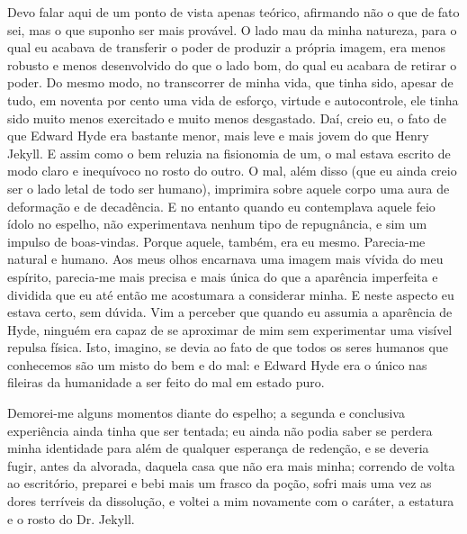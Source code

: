 Devo falar aqui de um ponto de vista apenas teórico, afirmando não o que
de fato sei, mas o que suponho ser mais provável.  O lado mau da minha
natureza, para o qual eu acabava de transferir o poder de produzir a
própria imagem, era menos robusto e menos desenvolvido do que o lado
bom, do qual eu acabara de retirar o poder. Do mesmo modo, no
transcorrer de minha vida, que tinha sido, apesar de tudo, em noventa
por cento uma vida de esforço, virtude e autocontrole, ele tinha sido
muito menos exercitado e muito menos desgastado.  Daí, creio eu, o fato
de que Edward Hyde era bastante menor, mais leve e mais jovem do que
Henry Jekyll.  E assim como o bem reluzia na fisionomia de um, o mal
estava escrito de modo claro e inequívoco no rosto do outro.  O mal,
além disso (que eu ainda creio ser o lado letal de todo ser humano),
imprimira sobre aquele corpo uma aura de deformação e de decadência.  E
no entanto quando eu contemplava aquele feio ídolo no espelho, não
experimentava nenhum tipo de repugnância, e sim um impulso de
boas-vindas.  Porque aquele, também, era eu mesmo.  Parecia-me natural
e humano.  Aos meus olhos encarnava uma imagem mais vívida do meu
espírito, parecia-me mais precisa e mais única do que a aparência
imperfeita e dividida que eu até então me acostumara a considerar
minha.  E neste aspecto eu estava certo, sem dúvida.  Vim a perceber
que quando eu assumia a aparência de Hyde, ninguém era capaz de se
aproximar de mim sem experimentar uma visível repulsa física.  Isto,
imagino, se devia ao fato de que todos os seres humanos que conhecemos
são um misto do bem e do mal: e Edward Hyde era o único nas fileiras da
humanidade a ser feito do mal em estado puro.

Demorei-me alguns momentos diante do espelho; a segunda e conclusiva
experiência ainda tinha que ser tentada; eu ainda não podia saber se
perdera minha identidade para além de qualquer esperança de redenção, e
se deveria fugir, antes da alvorada, daquela casa que não era mais
minha; correndo de volta ao escritório, preparei e bebi mais um frasco
da poção, sofri mais uma vez as dores terríveis da dissolução, e voltei
a mim novamente com o caráter, a estatura e o rosto do Dr. Jekyll.

